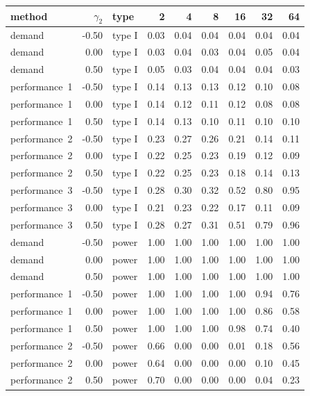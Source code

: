\documentclass[12pt]{article}
\begin{document}
\begin{table}[ht]
\centering
\begingroup\footnotesize
\begin{tabular}{lrlrrrrrr}
  \hline
method & $\gamma_2$ & type & 2 & 4 & 8 & 16 & 32 & 64 \\
  \hline
demand & -0.50 & type I & 0.03 & 0.04 & 0.04 & 0.04 & 0.04 & 0.04 \\
  demand & 0.00 & type I & 0.03 & 0.04 & 0.03 & 0.04 & 0.05 & 0.04 \\
  demand & 0.50 & type I & 0.05 & 0.03 & 0.04 & 0.04 & 0.04 & 0.03 \\
  performance~1 & -0.50 & type I & 0.14 & 0.13 & 0.13 & 0.12 & 0.10 & 0.08 \\
  performance~1 & 0.00 & type I & 0.14 & 0.12 & 0.11 & 0.12 & 0.08 & 0.08 \\
  performance~1 & 0.50 & type I & 0.14 & 0.13 & 0.10 & 0.11 & 0.10 & 0.10 \\
  performance~2 & -0.50 & type I & 0.23 & 0.27 & 0.26 & 0.21 & 0.14 & 0.11 \\
  performance~2 & 0.00 & type I & 0.22 & 0.25 & 0.23 & 0.19 & 0.12 & 0.09 \\
  performance~2 & 0.50 & type I & 0.22 & 0.25 & 0.23 & 0.18 & 0.14 & 0.13 \\
  performance~3 & -0.50 & type I & 0.28 & 0.30 & 0.32 & 0.52 & 0.80 & 0.95 \\
  performance~3 & 0.00 & type I & 0.21 & 0.23 & 0.22 & 0.17 & 0.11 & 0.09 \\
  performance~3 & 0.50 & type I & 0.28 & 0.27 & 0.31 & 0.51 & 0.79 & 0.96 \\
  demand & -0.50 & power & 1.00 & 1.00 & 1.00 & 1.00 & 1.00 & 1.00 \\
  demand & 0.00 & power & 1.00 & 1.00 & 1.00 & 1.00 & 1.00 & 1.00 \\
  demand & 0.50 & power & 1.00 & 1.00 & 1.00 & 1.00 & 1.00 & 1.00 \\
  performance~1 & -0.50 & power & 1.00 & 1.00 & 1.00 & 1.00 & 0.94 & 0.76 \\
  performance~1 & 0.00 & power & 1.00 & 1.00 & 1.00 & 1.00 & 0.86 & 0.58 \\
  performance~1 & 0.50 & power & 1.00 & 1.00 & 1.00 & 0.98 & 0.74 & 0.40 \\
  performance~2 & -0.50 & power & 0.66 & 0.00 & 0.00 & 0.01 & 0.18 & 0.56 \\
  performance~2 & 0.00 & power & 0.64 & 0.00 & 0.00 & 0.00 & 0.10 & 0.45 \\
  performance~2 & 0.50 & power & 0.70 & 0.00 & 0.00 & 0.00 & 0.04 & 0.23 \\

\end{tabular}
\end{table}
\end{document}
